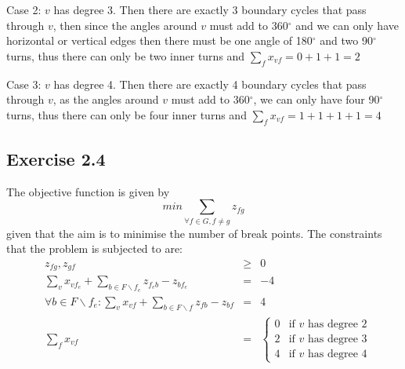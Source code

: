 Case 2: \(v\) has degree 3.\newline
Then there are exactly 3 boundary cycles that pass through \(v\), then since the angles around \(v\) must add to 360\(^\circ\) and we can only have horizontal or vertical edges then there must be one angle of 180\(^\circ\) and two 90\(^\circ\) turns, thus there can only be two inner turns and  \(\sum_f x_{vf} = 0 + 1+ 1= 2 \)

Case 3: \(v\) has degree 4.\newline
Then there are exactly 4 boundary cycles that pass through \(v\), as the angles around \(v\) must add to 360\(^\circ\),  we can only have four 90\(^\circ\) turns, thus there can only be four inner turns and  \(\sum_f x_{vf} = 1 +1 + 1+ 1= 4 \)

\subsection{Exercise 2.4}
The objective function is given by \[min \sum_{\forall f \in G, f \neq g} z_{fg}\] given that the aim is to minimise the number of break points. The constraints that the problem is subjected to are:
\begin{align}
  &z_{fg}, z_{gf}& \geq& 0\\
  &\sum_{v} x_{vf_{e}} + \sum_{b\in F \backslash {f_e}} z_{f_{e}b} - z_{bf_{e}}& =& -4\\
  &\forall b \in F \backslash {f_e}:\sum_{v} x_{vf} + \sum_{b\in F\backslash {f}} z_{fb} - z_{bf}& =& 4\\
  & \sum_f x_{vf} & =&
  \begin{cases}  
    0 & \text{if \(v\) has degree \(2\)}\\
    2 & \text{if \(v\) has degree \(3\)}\\
    4 & \text{if \(v\) has degree \(4\)}
  \end{cases}
\end{align}

